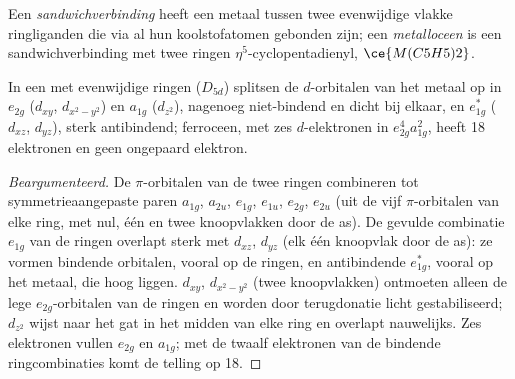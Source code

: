 \begin{definition}[Metallocenen]\label{def:b3:organometallic-bonding:metallocene}
Een \emph{sandwichverbinding} heeft een metaal
tussen twee evenwijdige vlakke ringliganden die via al hun
koolstofatomen gebonden zijn; een
\emph{metalloceen} is een sandwichverbinding met twee ringen $\eta^5$-cyclopentadienyl,
$\ce{M(C5H5)2}$.
\end{definition}

\begin{proposition}\label{prop:b3:organometallic-bonding:ferrocene}
In een  met evenwijdige ringen ($D_{5d}$) splitsen de $d$-orbitalen van het metaal op in $e_{2g}$
($d_{xy}$, $d_{x^2-y^2}$) en $a_{1g}$ ($d_{z^2}$), nagenoeg niet-bindend en dicht bij elkaar, en $e_{1g}^\ast$ ($d_{xz}$,
$d_{yz}$), sterk antibindend; ferroceen, met zes $d$-elektronen in $e_{2g}^4a_{1g}^2$, heeft 18
elektronen en geen ongepaard elektron.
\end{proposition}

\begin{proof}[Beargumenteerd]
De $\pi$-orbitalen van de twee ringen combineren tot symmetrieaangepaste paren $a_{1g}$, $a_{2u}$,
$e_{1g}$, $e_{1u}$, $e_{2g}$, $e_{2u}$ (uit de vijf $\pi$-orbitalen van elke ring, met nul, één en twee
knoopvlakken door de as). De gevulde combinatie $e_{1g}$ van de ringen overlapt
sterk met $d_{xz}$, $d_{yz}$ (elk één knoopvlak door de as): ze vormen bindende
orbitalen, vooral op de ringen, en antibindende $e_{1g}^\ast$, vooral op het metaal, die hoog liggen. $d_{xy}$, $d_{x^2-y^2}$
(twee knoopvlakken) ontmoeten alleen de lege $e_{2g}$-orbitalen van de ringen en worden door
terugdonatie licht gestabiliseerd; $d_{z^2}$ wijst naar het gat in het midden van elke ring en
overlapt nauwelijks. Zes elektronen vullen $e_{2g}$ en $a_{1g}$; met de twaalf elektronen van de
bindende ringcombinaties komt de telling op 18.
\end{proof}

